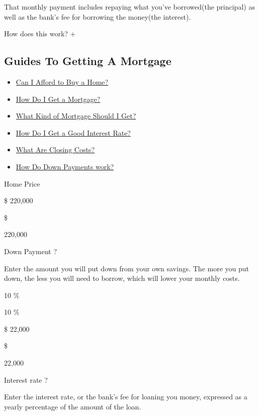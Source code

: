That monthly payment includes repaying what you've borrowed(the
principal) as well as the bank's fee for borrowing the money(the
interest).

How does this work? +

\hypertarget{guides-to-getting-a-mortgage}{%
\subsection{Guides To Getting A
Mortgage}\label{guides-to-getting-a-mortgage}}

\begin{itemize}
\tightlist
\item
  \href{https://www.nytimes.com/interactive/2017/realestate/Can-I-Afford-to-Buy-a-Home.html}{Can
  I Afford to Buy a Home?}
\item
  \href{https://www.nytimes.com/interactive/2017/realestate/How-Do-I-Get-a-Mortgage.html}{How
  Do I Get a Mortgage?}
\item
  \href{https://www.nytimes.com/interactive/2017/realestate/What-Kind-of-Mortgage-Should-I-Get.html}{What
  Kind of Mortgage Should I Get?}
\item
  \href{https://www.nytimes.com/interactive/2017/realestate/How-Do-I-Get-a-Good-Interest-Rate.html}{How
  Do I Get a Good Interest Rate?}
\item
  \href{https://www.nytimes.com/interactive/2017/realestate/what-are-closing-costs.html}{What
  Are Closing Costs?}
\item
  \href{https://www.nytimes.com/interactive/2017/realestate/Down-payments.html}{How
  Do Down Payments work?}
\end{itemize}

Home Price

\$ 220,000

 \$

 220,000

Down Payment ?

Enter the amount you will put down from your own savings. The more you
put down, the less you will need to borrow, which will lower your
monthly costs.

10 \%

 10 \%

\$ 22,000

 \$

 22,000

Interest rate ?

Enter the interest rate, or the bank's fee for loaning you money,
expressed as a yearly percentage of the amount of the loan.

